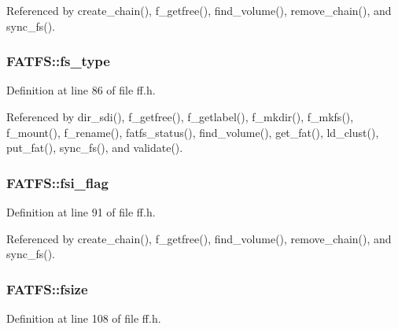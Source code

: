 Referenced by create\+\_\+chain(), f\+\_\+getfree(), find\+\_\+volume(), remove\+\_\+chain(), and sync\+\_\+fs().

\subsubsection[{\texorpdfstring{fs\+\_\+type}{fs_type}}]{ F\+A\+T\+F\+S\+::fs\+\_\+type}\hypertarget{structFATFS_add27d97babe807b573eac98a71dc4ae5}{}\label{structFATFS_add27d97babe807b573eac98a71dc4ae5}


Definition at line 86 of file ff.\+h.



Referenced by dir\+\_\+sdi(), f\+\_\+getfree(), f\+\_\+getlabel(), f\+\_\+mkdir(), f\+\_\+mkfs(), f\+\_\+mount(), f\+\_\+rename(), fatfs\+\_\+status(), find\+\_\+volume(), get\+\_\+fat(), ld\+\_\+clust(), put\+\_\+fat(), sync\+\_\+fs(), and validate().

\subsubsection[{\texorpdfstring{fsi\+\_\+flag}{fsi_flag}}]{ F\+A\+T\+F\+S\+::fsi\+\_\+flag}\hypertarget{structFATFS_a84e9cdc5a6a8e33ea7ec192058abf161}{}\label{structFATFS_a84e9cdc5a6a8e33ea7ec192058abf161}


Definition at line 91 of file ff.\+h.



Referenced by create\+\_\+chain(), f\+\_\+getfree(), find\+\_\+volume(), remove\+\_\+chain(), and sync\+\_\+fs().

\subsubsection[{\texorpdfstring{fsize}{fsize}}]{ F\+A\+T\+F\+S\+::fsize}\hypertarget{structFATFS_a53e9560659f14e66f306c2c444198bf3}{}\label{structFATFS_a53e9560659f14e66f306c2c444198bf3}


Definition at line 108 of file ff.\+h.



